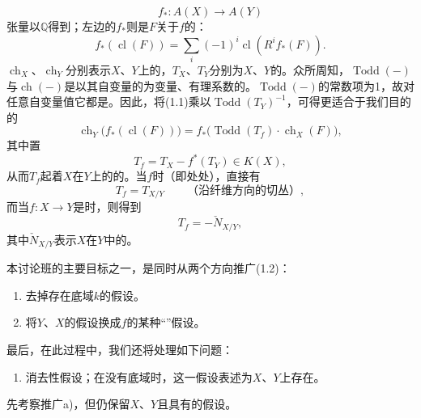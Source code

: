\[f_*:A(X)\longrightarrow A(Y)\]
张量以$\mathbb Q$得到；左边的$f_*$则是$F$关于$f$的：
\[f_*(\operatorname{cl}(F))=\sum_i(-1)^i\operatorname{cl}(R^if_*(F)).\]
$\operatorname{ch}_X$、$\operatorname{ch}_Y$分别表示$X$、$Y$上的，$T_X$、$T_Y$分别为$X$、$Y$的。众所周知，$\operatorname{Todd}(-)$与$\operatorname{ch}(-)$是以其自变量的为变量、有理系数的。$\operatorname{Todd}(-)$的常数项为1，故对任意自变量值它都是。因此，将(1.1)乘以$\operatorname{Todd}(T_Y)^{-1}$，可得更适合于我们目的的
\[
\operatorname{ch}_Y\bigl(f_*(\operatorname{cl}(F))\bigr)
=f_*\bigl(\operatorname{Todd}(T_f)\cdot\operatorname{ch}_X(F)\bigr),
\tag{1.2}
\]
其中置
\[T_f=T_X-f^*(T_Y)\in K(X),\tag{1.3}\]
从而$T_f$起着$X$在$Y$上的的。当$f$时（即处处），直接有
\[T_f=T_{X/Y}\qquad\text{（沿纤维方向的切丛）},\]
而当$f:X\longrightarrow Y$是时，则得到
\[T_f=-\check N_{X/Y},\]
其中$\check N_{X/Y}$表示$X$在$Y$中的。

本讨论班的主要目标之一，是同时从两个方向推广(1.2)：
\begin{enumerate}
\item[a)] 去掉存在底域$k$的假设。
\item[b)] 将$Y$、$X$的假设换成$f$的某种“”假设。
\end{enumerate}
最后，在此过程中，我们还将处理如下问题：
\begin{enumerate}
\item[c)] 消去性假设；在没有底域时，这一假设表述为$X$、$Y$上存在。
\end{enumerate}
先考察推广a)，但仍保留$X$、$Y$且具有的假设。

